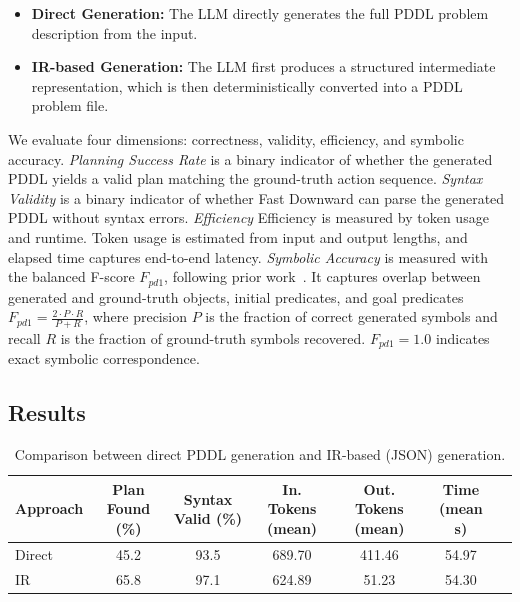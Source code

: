 \documentclass[acmlarge]{acmart}
\begin{document}
\begin{itemize}
    \item \textbf{Direct Generation:} The LLM directly generates the full PDDL problem description from the input.
    \item \textbf{IR-based Generation:} The LLM first produces a structured intermediate representation, which is then deterministically converted into a PDDL problem file.
\end{itemize}


We evaluate four dimensions: correctness, validity, efficiency, and symbolic accuracy. \textit{Planning Success Rate} is a binary indicator of whether the generated PDDL yields a valid plan matching the ground-truth action sequence. \textit{Syntax Validity} is a binary indicator of whether Fast Downward can parse the generated PDDL without syntax errors. \textit{Efficiency}
Efficiency is measured by token usage and runtime. Token usage is estimated from input and output lengths, and elapsed time captures end-to-end latency. \textit{Symbolic Accuracy} is measured with the balanced F-score $F_{pd1}$, following prior work~\cite{planowl}. It captures overlap between generated and ground-truth objects, initial predicates, and goal predicates $F_{pd1} = \frac{2 \cdot P \cdot R}{P + R}$, where precision $P$ is the fraction of correct generated symbols and recall $R$ is the fraction of ground-truth symbols recovered. $F_{pd1} = 1.0$ indicates exact symbolic correspondence.

\subsection{Results}
\label{sec:results}



\begin{table}[h]
\centering
\caption{Comparison between direct PDDL generation and IR-based (JSON) generation.}
\label{tab:main-results}
\begin{tabular}{lcccccc}
\toprule
\textbf{Approach} & \textbf{Plan Found (\%)} & \textbf{Syntax Valid (\%)} & \textbf{In. Tokens (mean)} & \textbf{Out. Tokens (mean)} & \textbf{Time (mean s)} \\
\midrule
Direct & 45.2 & 93.5 & 689.70 & 411.46 & 54.97 \\
IR & 65.8 & 97.1 & 624.89 & 51.23 & 54.30 \\
\bottomrule
\end{tabular}
\end{table}
\end{document}
